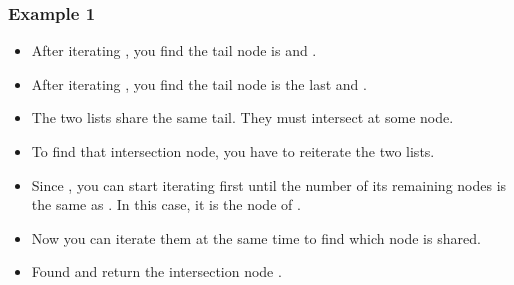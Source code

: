 \documentclass[letterpaper,12pt,english]{book}
\begin{document}
\subsubsection{Example 1}
\label{\detokenize{Linked_List/02_LL_160_Intersection_of_Two_Linked_Lists:id2}}\begin{itemize}
\item {} 
\sphinxAtStartPar
After iterating , you find the tail node is \sphinxcode{\sphinxupquote{\textquotesingle{}5\textquotesingle{}}} and .

\item {} 
\sphinxAtStartPar
After iterating , you find the tail node is the last \sphinxcode{\sphinxupquote{\textquotesingle{}5\textquotesingle{}}} and .

\item {} 
\sphinxAtStartPar
The two lists share the same tail. They must intersect at some node.

\item {} 
\sphinxAtStartPar
To find that intersection node, you have to reiterate the two lists.

\item {} 
\sphinxAtStartPar
Since , you can start iterating  first until the number of its remaining nodes is the same as . In this case, it is the node \sphinxcode{\sphinxupquote{\textquotesingle{}6\textquotesingle{}}} of .

\item {} 
\sphinxAtStartPar
Now you can iterate them at the same time to find which node is shared.

\item {} 
\sphinxAtStartPar
Found and return the intersection node \sphinxcode{\sphinxupquote{\textquotesingle{}8\textquotesingle{}}}.

\end{itemize}
\end{document}
